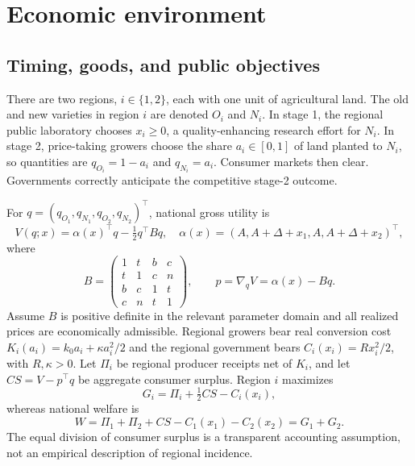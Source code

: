 \documentclass[11pt]{article}
\begin{document}
\section{Economic environment}
\subsection{Timing, goods, and public objectives}
There are two regions, $i\in\{1,2\}$, each with one unit of agricultural land. The old and new varieties in region $i$ are denoted $O_i$ and $N_i$. In stage 1, the regional public laboratory chooses $x_i\geq 0$, a quality-enhancing research effort for $N_i$. In stage 2, price-taking growers choose the share $a_i\in[0,1]$ of land planted to $N_i$, so quantities are $q_{O_i}=1-a_i$ and $q_{N_i}=a_i$. Consumer markets then clear. Governments correctly anticipate the competitive stage-2 outcome.

For $q=(q_{O_1},q_{N_1},q_{O_2},q_{N_2})^\top$, national gross utility is
\begin{equation}
 V(q;x)=\alpha(x)^\top q-\tfrac12q^\top Bq,\quad
 \alpha(x)=(A,A+\Delta+x_1,A,A+\Delta+x_2)^\top,
 \label{eq:utility}
\end{equation}
where
\begin{equation}
 B=\begin{pmatrix}
 1&t&b&c\\ t&1&c&n\\ b&c&1&t\\ c&n&t&1
 \end{pmatrix},\qquad p=\nabla_q V=\alpha(x)-Bq.
 \label{eq:demand}
\end{equation}
Assume $B$ is positive definite in the relevant parameter domain and all realized prices are economically admissible. Regional growers bear real conversion cost $K_i(a_i)=k_0a_i+\kappa a_i^2/2$ and the regional government bears $C_i(x_i)=Rx_i^2/2$, with $R,\kappa>0$. Let $\Pi_i$ be regional producer receipts net of $K_i$, and let $CS=V-p^\top q$ be aggregate consumer surplus. Region $i$ maximizes
\begin{equation}
 G_i=\Pi_i+\tfrac12 CS-C_i(x_i),
 \label{eq:local}
\end{equation}
whereas national welfare is
\begin{equation}
 W=\Pi_1+\Pi_2+CS-C_1(x_1)-C_2(x_2)=G_1+G_2.
 \label{eq:welfare}
\end{equation}
The equal division of consumer surplus is a transparent accounting assumption, not an empirical description of regional incidence.
\end{document}
